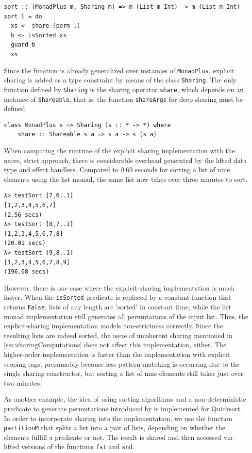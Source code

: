 \documentclass[a4paper, 11pt, fleqn, twoside, abstract=on]{scrreprt}
\newcommand{\hinl}[1]{\texttt{#1}}
\begin{document}
\begin{verbatim}
sort :: (MonadPlus m, Sharing m) => m (List m Int) -> m (List m Int)
sort l = do
  xs <- share (perm l)
  b <- isSorted xs
  guard b
  xs
\end{verbatim}

Since the function is already generalized over instances of \hinl{MonadPlus}, explicit sharing is added as a type constraint by means of the class \hinl{Sharing}.
The only function defined by \hinl{Sharing} is the sharing operator \hinl{share}, which depends on an instance of \hinl{Shareable}, that is, the function \hinl{shareArgs} for deep sharing must be defined.

\begin{verbatim}
class MonadPlus s => Sharing (s :: * -> *) where
    share :: Shareable s a => s a -> s (s a)
\end{verbatim}

When comparing the runtime of the explicit sharing implementation with the naive, strict approach, there is considerable overhead generated by the lifted data type and effect handlers.
Compared to 0.69 seconds for sorting a list of nine elements using the list monad, the same list now takes over three minutes to sort.

\begin{verbatim}
λ> testSort [7,6..1]
[1,2,3,4,5,6,7]
(2.56 secs)
λ> testSort [8,7..1]
[1,2,3,4,5,6,7,8]
(20.01 secs)
λ> testSort [9,8..1]
[1,2,3,4,5,6,7,8,9]
(196.08 secs)
\end{verbatim}

However, there is one case where the explicit-sharing implementation is much faster.
When the \hinl{isSorted} predicate is replaced by a constant function that returns \hinl{False}, lists of any length are 'sorted' in constant time, while the list monad implementation still generates all permutations of the input list.
Thus, the explicit-sharing implementation models non-strictness correctly.
Since the resulting lists are indeed sorted, the issue of incoherent sharing mentioned in \autoref{sec:sharingComputations} does not affect this implementation, either.
The higher-order implementation is faster than the implementation with explicit scoping tags, presumably because less pattern matching is occurring due to the single sharing constructor, but sorting a list of nine elements still takes just over two minutes.

As another example, the idea of using sorting algorithms and a non-deterministic predicate to generate permutations introduced by \citet{Christiansen2016allsorts} is implemented for Quicksort.
In order to incorporate sharing into the implementation, we use the function \hinl{partitionM} that splits a list into a pair of lists, depending on whether the elements fulfill a predicate or not.
The result is shared and then accessed via lifted versions of the functions \hinl{fst} and \hinl{snd}.
\end{document}
